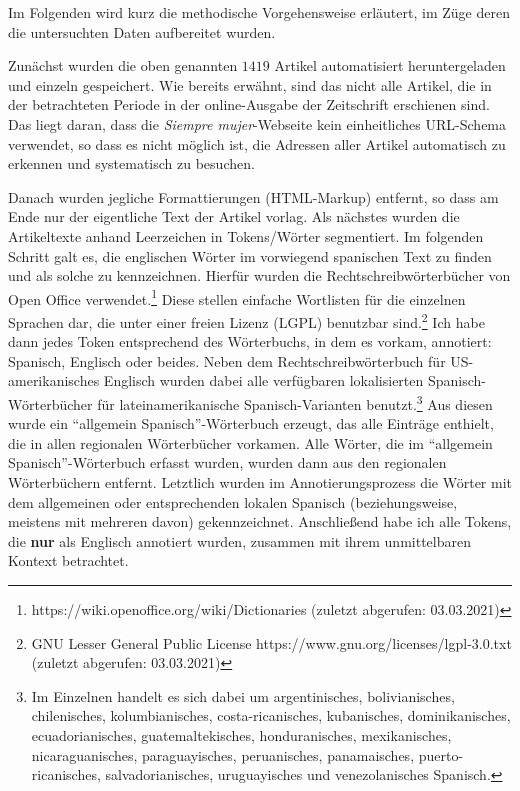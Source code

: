 Im Folgenden wird kurz die methodische Vorgehensweise erläutert, im Züge deren die untersuchten Daten aufbereitet wurden.

Zunächst wurden die oben genannten $1419$ Artikel automatisiert heruntergeladen und einzeln gespeichert.
Wie bereits erwähnt, sind das nicht alle Artikel, die in der betrachteten Periode in der online-Ausgabe der Zeitschrift erschienen sind.
Das liegt daran, dass die \textit{Siempre mujer}-Webseite kein einheitliches URL-Schema verwendet, so dass es nicht möglich ist, die Adressen aller Artikel automatisch zu erkennen und systematisch zu besuchen.

Danach wurden jegliche Formattierungen (HTML-Markup) entfernt, so dass am Ende nur der eigentliche Text der Artikel vorlag.
Als nächstes wurden die Artikeltexte anhand Leerzeichen in Tokens/Wörter segmentiert.
Im folgenden Schritt galt es, die englischen Wörter im vorwiegend spanischen Text zu finden und als solche zu kennzeichnen.
Hierfür wurden die Rechtschreibwörterbücher von Open Office verwendet.\footnote{https://wiki.openoffice.org/wiki/Dictionaries (zuletzt abgerufen: 03.03.2021)}
Diese stellen einfache Wortlisten für die einzelnen Sprachen dar, die unter einer freien Lizenz (LGPL) benutzbar sind.\footnote{GNU Lesser General Public License https://www.gnu.org/licenses/lgpl-3.0.txt (zuletzt abgerufen: 03.03.2021)}
Ich habe dann jedes Token entsprechend des Wörterbuchs, in dem es vorkam, annotiert: Spanisch, Englisch oder beides.
Neben dem Rechtschreibwörterbuch für US-amerikanisches Englisch wurden dabei alle verfügbaren lokalisierten Spanisch-Wörterbücher für lateinamerikanische Spanisch-Varianten benutzt.\footnote{Im Einzelnen handelt es sich dabei um argentinisches, bolivianisches, chilenisches, kolumbianisches, costa-ricanisches, kubanisches, dominikanisches, ecuadorianisches, guatemaltekisches, honduranisches, mexikanisches, nicaraguanisches, paraguayisches, peruanisches, panamaisches, puerto-ricanisches, salvadorianisches, uruguayisches und venezolanisches Spanisch.}
Aus diesen wurde ein ``allgemein Spanisch''-Wörterbuch erzeugt, das alle Einträge enthielt, die in allen regionalen Wörterbücher vorkamen.
Alle Wörter, die im ``allgemein Spanisch''-Wörterbuch erfasst wurden, wurden dann aus den regionalen Wörterbüchern entfernt.
Letztlich wurden im Annotierungsprozess die Wörter mit dem allgemeinen oder entsprechenden lokalen Spanisch (beziehungsweise, meistens mit mehreren davon) gekennzeichnet.
Anschließend habe ich alle Tokens, die \textbf{nur} als Englisch annotiert wurden, zusammen mit ihrem unmittelbaren Kontext betrachtet.

